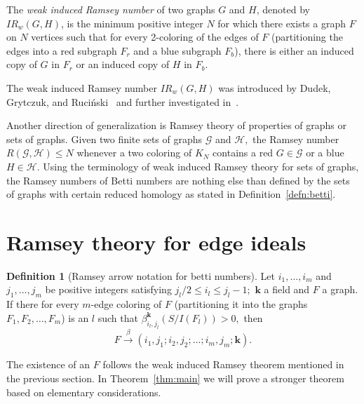 \documentclass{article}
\theoremstyle{plain}
\theoremstyle{definition}
\newtheorem{defn}{Definition}
\begin{document}
The \emph{weak induced Ramsey number} of two graphs $G$ and $H$, denoted by $IR_w(G, H)$, is the minimum positive integer $N$ for which there exists a graph $F$ on $N$ vertices such that for every 2-coloring of the edges of $F$ (partitioning the edges into a red subgraph $F_r$ and a blue subgraph $F_b$), there is either an induced copy of $G$ in $F_r$ or an induced copy of $H$ in $F_b$.

The weak induced Ramsey number $IR_w(G,H)$ was introduced by Dudek, Grytczuk, and Ruci\'nski~\cite{dudek2023} and further investigated in~\cite{debski2023}.

Another direction of generalization is Ramsey theory of properties of graphs or sets of graphs. Given two finite sets of graphs $\mathcal{G}$ and $\mathcal{H},$ the Ramsey number $R(\mathcal{G},\mathcal{H}) \leq N$ whenever a two coloring of $K_N$ contains a red $G\in  \mathcal{G}$ or a blue $H \in \mathcal{H}.$ Using the terminology of weak induced Ramsey theory for sets of graphs, the Ramsey numbers of Betti numbers are nothing else than defined by the sets of graphs with certain reduced homology as stated in Definition~\ref{defn:betti}.

\section{Ramsey theory for edge ideals}

\begin{defn}[Ramsey arrow notation for betti numbers]
Let $i_1,\ldots,i_m$ and $j_1,\ldots, j_m$ be positive integers satisfying $j_l/2 \leq i_l \leq j_l-1;$  $\mathbf{k}$ a field and $F$ a graph. If there for every $m$-edge coloring of $F$ (partitioning it into the graphs $F_1, F_2, \ldots, F_m$) is an $l$ such that $\beta_{i_l,j_l}^{\mathbf{k}}(S/I(F_l))>0,$ then 
\[ F \xrightarrow{\beta} (i_1,j_1;i_2,j_2;\ldots;i_m,j_m; \mathbf{k}). \]
\end{defn}

The existence of an $F$ follows the weak induced Ramsey theorem mentioned in the previous section. In Theorem~\ref{thm:main} we will prove a stronger theorem based on elementary considerations.
\end{document}
